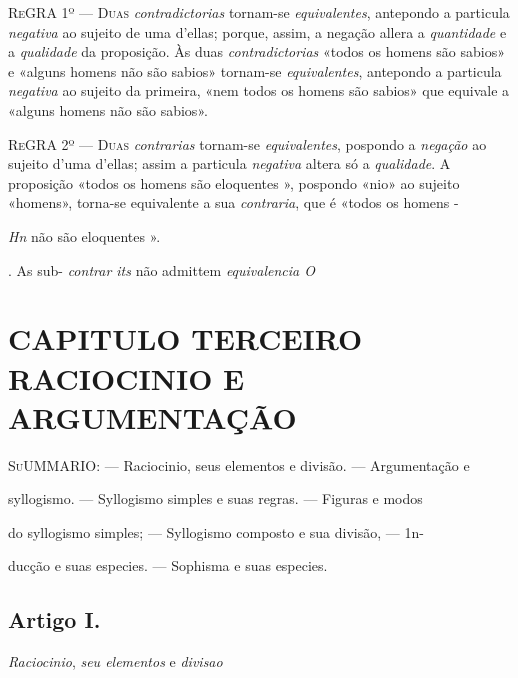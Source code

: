 
 

\textsc{ReGRA} 1º --- \textsc{Duas} \emph{contradictorias} tornam-se \emph{equivalentes}, antepondo a particula \emph{negativa} ao sujeito de uma d'ellas; porque, assim, a negação allera a \emph{quantidade} e a \emph{qualidade} da proposição. Às duas \emph{contradictorias} «todos os homens são sabios» e «alguns homens não são sabios» tornam-se \emph{equivalentes}, antepondo a particula \emph{negativa} ao sujeito da primeira, «nem todos os homens são sabios» que equivale a «alguns homens não são sabios».

\textsc{ReGRA} 2º --- \textsc{Duas} \emph{contrarias} tornam-se \emph{equivalentes}, pospondo a \emph{negação} ao sujeito d'uma d'ellas; assim a particula \emph{negativa} altera só a \emph{qualidade}. A proposição «todos os homens são eloquentes », pospondo «nio» ao sujeito «homens», torna-se equivalente a sua \emph{contraria}, que é «todos os homens -

\emph{Hn} não são eloquentes ».

. As sub- \emph{contrar its} não admittem \emph{equivalencia O}


\chapter*{CAPITULO TERCEIRO\\[0.3em]\large RACIOCINIO E ARGUMENTAÇÃO}

\textsc{SuUMMARIO}: --- Raciocinio, seus elementos e divisão. --- Argumentação e

syllogismo. --- Syllogismo simples e suas regras. --- Figuras e modos

do syllogismo simples; --- Syllogismo composto e sua divisão, --- 1n-

ducção e suas especies. --- Sophisma e suas especies.


\section*{Artigo I.}

\emph{Raciocinio}, \emph{seu elementos} e \emph{divisao}


